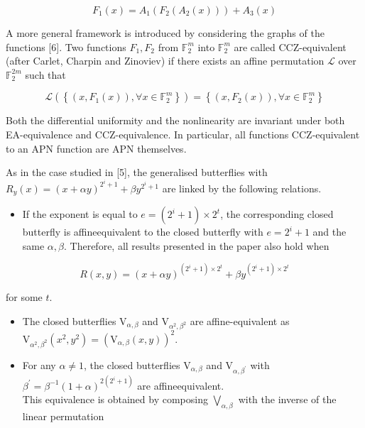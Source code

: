 \documentclass[10pt]{article}
\begin{document}
$$
F_{1}(x)=A_{1}\left(F_{2}\left(A_{2}(x)\right)\right)+A_{3}(x)
$$

A more general framework is introduced by considering the graphs of the functions [6]. Two functions $F_{1}, F_{2}$ from $\mathbb{F}_{2}^{m}$ into $\mathbb{F}_{2}^{m}$ are called CCZ-equivalent (after Carlet, Charpin and Zinoviev) if there exists an affine permutation $\mathcal{L}$ over $\mathbb{F}_{2}^{2 m}$ such that

$$
\mathcal{L}\left(\left\{\left(x, F_{1}(x)\right), \forall x \in \mathbb{F}_{2}^{m}\right\}\right)=\left\{\left(x, F_{2}(x)\right), \forall x \in \mathbb{F}_{2}^{m}\right\}
$$

Both the differential uniformity and the nonlinearity are invariant under both EA-equivalence and CCZ-equivalence. In particular, all functions CCZ-equivalent to an APN function are APN themselves.

As in the case studied in [5], the generalised butterflies with $R_{y}(x)=(x+\alpha y)^{2^{i}+1}+\beta y^{2^{i}+1}$ are linked by the following relations.

\begin{itemize}
  \item If the exponent is equal to $e=\left(2^{i}+1\right) \times 2^{t}$, the corresponding closed butterfly is affineequivalent to the closed butterfly with $e=2^{i}+1$ and the same $\alpha, \beta$. Therefore, all results presented in the paper also hold when
\end{itemize}

$$
R(x, y)=(x+\alpha y)^{\left(2^{i}+1\right) \times 2^{t}}+\beta y^{\left(2^{i}+1\right) \times 2^{t}}
$$

for some $t$.

\begin{itemize}
  \item The closed butterflies $\mathrm{V}_{\alpha, \beta}$ and $\mathrm{V}_{\alpha^{2}, \beta^{2}}$ are affine-equivalent as $\mathrm{V}_{\alpha^{2}, \beta^{2}}\left(x^{2}, y^{2}\right)=\left(\mathrm{V}_{\alpha, \beta}(x, y)\right)^{2}$.
  \item For any $\alpha \neq 1$, the closed butterflies $\mathrm{V}_{\alpha, \beta}$ and $\mathrm{V}_{\alpha, \beta^{\prime}}$ with $\beta^{\prime}=\beta^{-1}(1+\alpha)^{2\left(2^{i}+1\right)}$ are affineequivalent.\\
This equivalence is obtained by composing $\bigvee_{\alpha, \beta}$ with the inverse of the linear permutation
\end{itemize}
\end{document}
